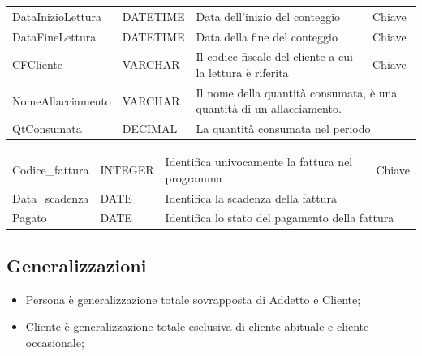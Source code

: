 \begin{center}
    \begin{tabularx}{\textwidth}{|l|l|l|X|}
        \hline
        \rowcolor{gray!30}
        \multicolumn{4}{|c|}{\textbf{Consumo}}\\
        \hline
        DataInizioLettura & DATETIME & Data dell'inizio del conteggio & Chiave \\
        \hline
        DataFineLettura & DATETIME & Data della fine del conteggio & Chiave \\
        \hline
        CFCliente & VARCHAR & Il codice fiscale del cliente a cui la lettura è riferita & Chiave \\
        \hline
        NomeAllacciamento & VARCHAR & \multicolumn{2}{l|}{Il nome della quantità consumata, è una quantità di un allacciamento.} \\
        \hline
        QtConsumata & DECIMAL & \multicolumn{2}{l|}{La quantità consumata nel periodo} \\
        \hline
    \end{tabularx}
\end{center}

\begin{center}
    \begin{tabularx}{\textwidth}{|l|l|l|X|}
        \hline
        \rowcolor{gray!30}
        \multicolumn{4}{|c|}{\textbf{Fattura}}\\
        \hline
        Codice\_fattura & INTEGER & Identifica univocamente la fattura nel programma & Chiave \\
        \hline
        Data\_scadenza & DATE & \multicolumn{2}{l|}{Identifica la scadenza della fattura} \\
        \hline
        Pagato & DATE & \multicolumn{2}{l|}{Identifica lo stato del pagamento della fattura} \\
        \hline
    \end{tabularx}
\end{center}



\subsection{Generalizzazioni}

\begin{itemize}
    \item Persona è generalizzazione totale sovrapposta di Addetto e Cliente;
    \item Cliente è generalizzazione totale esclusiva di cliente abituale e cliente occasionale;
\end{itemize}

